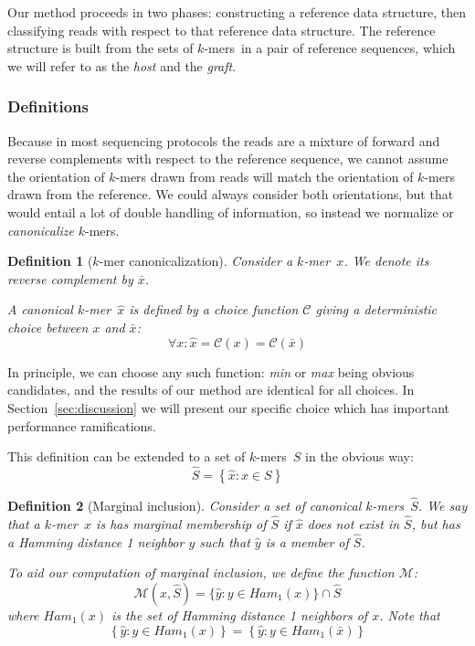 \documentclass{bioinfo}
\newcommand{\kmer}{$k$-mer{}}
\newcommand{\kmers}{$k$-mers{}}
\newtheorem{defn}{Definition}
\begin{document}
Our method proceeds in two phases: constructing a reference data
structure, then classifying reads with respect to that reference data
structure.  The reference structure is built from the sets of \kmers\ in
a pair of reference sequences, which we will refer to as the \textit{host}
and the \textit{graft}.

\subsubsection{Definitions}
\label{sec:xenome:defs}

Because in most sequencing protocols the reads are a mixture of forward and reverse complements
with respect to the reference sequence, we cannot assume the orientation of \kmers{} drawn from
reads will match the orientation of \kmers{} drawn from the reference. We could always consider both
orientations, but that would entail a lot of double handling of information, so instead we normalize
or \textit{canonicalize} \kmers.

\begin{defn}[\kmer{} canonicalization]

Consider a \kmer~$x$. We denote its reverse complement by $\bar{x}$.

A canonical \kmer~$\hat{x}$ is defined by a choice function $\mathcal{C}$
giving a deterministic choice between $x$ and $\bar{x}$:
$$
    \forall x: \hat{x} = \mathcal{C}(x) = \mathcal{C}(\bar{x})
$$
\end{defn}

In principle, we can choose any such function: \textit{min} or \textit{max}
being obvious candidates, and the results of our method are identical for
all choices. In Section~\ref{sec:discussion} we will present
our specific choice which has important performance ramifications.

This definition can be extended to a set of \kmers\ $S$ in the obvious way:
$$
    \hat{S} = \left\{ \hat{x} : x \in S \right\}
$$

\begin{defn}[Marginal inclusion]
Consider a set of canonical \kmers~$\hat{S}$.  We say that a \kmer~$x$
is has \textit{marginal} membership of $\hat{S}$ if $\hat{x}$ does not
exist in $\hat{S}$, but has a Hamming distance 1 neighbor $y$ such that
$\hat{y}$ is a member of $\hat{S}$.

To aid our computation of marginal inclusion, we define the
function $\mathcal{M}$:
$$
\mathcal{M}(x, \hat{S}) =
        \{ \hat{y} : y \in \textit{Ham}_1(x) \} \cap \hat{S}
$$
where $\textit{Ham}_1(x)$ is the set of Hamming distance 1 neighbors
of $x$. Note that
$$
    \left\{ \hat{y} : y \in \textit{Ham}_1(x) \right\} =
    \left\{ \hat{y} : y \in \textit{Ham}_1(\bar{x}) \right\}
$$
\end{defn}
\end{document}
